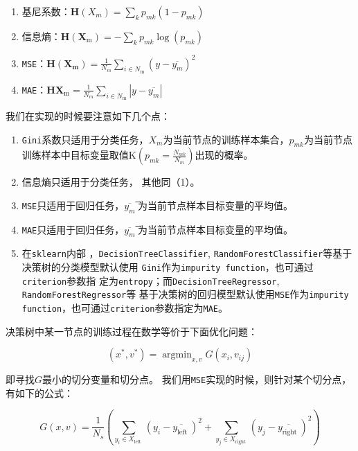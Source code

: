 \documentclass[11pt,a4paper]{elegantpaper}
\begin{document}
\begin{multicols}{2}
\begin{enumerate}
  \item 基尼系数：$\displaystyle \boldsymbol{H}\left(X_{m}\right)=\sum_{k} p_{m k}\left(1-p_{m k}\right)$
  \item 信息熵：$\displaystyle \boldsymbol{H}\left(\boldsymbol{X}_{\mathrm{m}}\right)=-\sum_{k} p_{m k} \log \left(p_{m k}\right)$
  \item \lstinline{MSE}：$\displaystyle \boldsymbol{H}\left(\boldsymbol{X}_{\boldsymbol{m}}\right)=\frac{1}{N_{m}} \sum_{i \in N_{\mathrm{m}}}\left(y-\overline{y_{m}}\right)^{2}$
  \item \lstinline{MAE}：$\displaystyle \boldsymbol{H X}_{\mathrm{m}}=\frac{1}{N_{m}} \sum_{i \in N_{\mathrm{m}}}\left|y-\overline{y_{m}}\right|$
\end{enumerate}

我们在实现的时候要注意如下几个点：

\begin{enumerate}
  \item \lstinline{Gini}系数只适用于分类任务，$X_m$为当前节点的训练样本集合，$p_{mk}$为当前节点训练样本中目标变量取值${{\mathrm{K}}}\left(p_{m k}=\frac{N_{m k}}{N_{m}}\right)$出现的概率。
  \item 信息熵只适用于分类任务， 其他同（1）。
  \item \lstinline{MSE}只适用于回归任务，$\overline{y_m }$ ̅为当前节点样本目标变量的平均值。
  \item \lstinline{MAE}只适用于回归任务，$\overline{y_m }$ ̅为当前节点样本目标变量的平均值。
  \item 在\lstinline{sklearn}内部
  ，\lstinline{DecisionTreeClassifier}, \lstinline{RandomForestClassifier}等基于决策树的分类模型默认使用
  \lstinline{Gini}作为\lstinline{impurity function}，也可通过\lstinline{criterion}参数指
  定为\lstinline{entropy}；而\lstinline{DecisionTreeRegressor}, \lstinline{RandomForestRegressor}等
  基于决策树的回归模型默认使用\lstinline{MSE}作为\lstinline{impurity function}，也可通过\lstinline{criterion}参数指定为\lstinline{MAE}。
\end{enumerate}

决策树中某一节点的训练过程在数学等价于下面优化问题：

$$
\left(x^{*}, v^{*}\right)=\operatorname{argmin}_{x, v} G\left(x_{i}, v_{i j}\right)
$$

即寻找$G$最小的切分变量和切分点。
我们用\lstinline{MSE}实现的时候，则针对某个切分点，有如下的公式：

$$
G(x, v)=\frac{1}{N_{s}}\left(\sum_{y_{i} \in X_{\text {left }}}\left(y_{i}-\overline{y_{\text {left }}}\right)^{2}+\sum_{y_{j} \in X_{\text {right }}}\left(y_{j}-\overline{y_{\text {right }}}\right)^{2}\right)
$$


\end{multicols}
\end{document}
